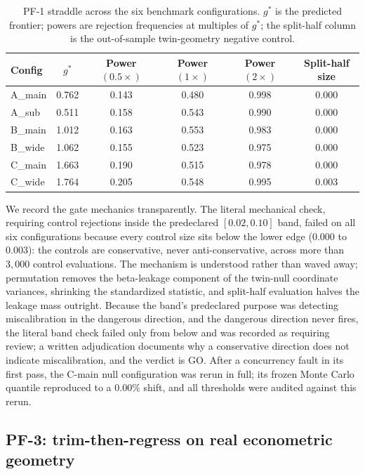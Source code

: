 \begin{table}[t]
\centering
\caption{PF-1 straddle across the six benchmark configurations. $g^*$ is the predicted frontier; powers are rejection frequencies at multiples of $g^*$; the split-half column is the out-of-sample twin-geometry negative control.}
\label{tab:pf1}
\begin{tabular}{lccccc}
\toprule
Config & $g^*$ & Power $(0.5\times)$ & Power $(1\times)$ & Power $(2\times)$ & Split-half size \\
\midrule
A\_main & 0.762 & 0.143 & 0.480 & 0.998 & 0.000 \\
A\_sub  & 0.511 & 0.158 & 0.543 & 0.990 & 0.000 \\
B\_main & 1.012 & 0.163 & 0.553 & 0.983 & 0.000 \\
B\_wide & 1.062 & 0.155 & 0.523 & 0.975 & 0.000 \\
C\_main & 1.663 & 0.190 & 0.515 & 0.978 & 0.000 \\
C\_wide & 1.764 & 0.205 & 0.548 & 0.995 & 0.003 \\
\bottomrule
\end{tabular}
\end{table}

We record the gate mechanics transparently. The literal mechanical check, requiring control rejections inside the predeclared $[0.02, 0.10]$ band, failed on all six configurations because every control size sits below the lower edge ($0.000$ to $0.003$): the controls are conservative, never anti-conservative, across more than $3{,}000$ control evaluations. The mechanism is understood rather than waved away; permutation removes the beta-leakage component of the twin-null coordinate variances, shrinking the standardized statistic, and split-half evaluation halves the leakage mass outright. Because the band's predeclared purpose was detecting miscalibration in the dangerous direction, and the dangerous direction never fires, the literal band check failed only from below and was recorded as requiring review; a written adjudication documents why a conservative direction does not indicate miscalibration, and the verdict is GO. After a concurrency fault in its first pass, the C-main null configuration was rerun in full; its frozen Monte Carlo quantile reproduced to a $0.00\%$ shift, and all thresholds were audited against this rerun.

\subsection*{PF-3: trim-then-regress on real econometric geometry}

